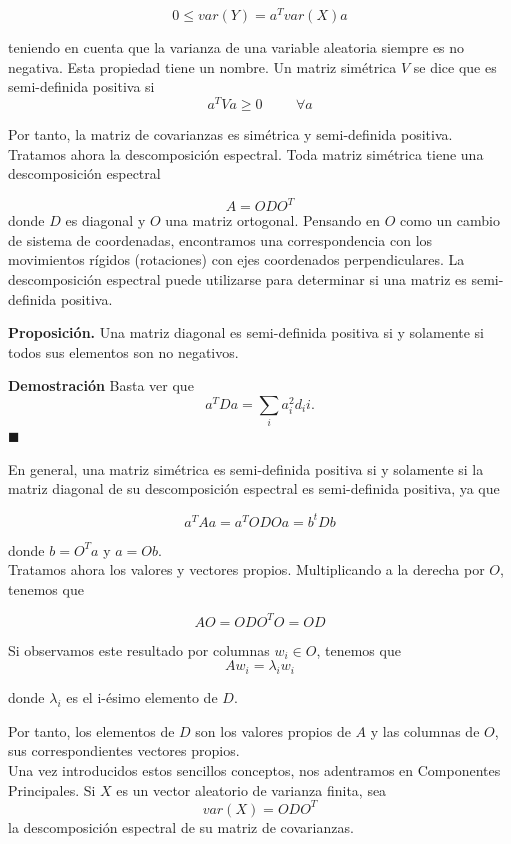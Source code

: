 	$$ 0 \leq var(Y) = a^T var(X) a$$
	
	teniendo en cuenta que la varianza de una variable aleatoria siempre es no negativa. Esta propiedad tiene un nombre. Un matriz simétrica $V$ se dice que es semi-definida positiva si 
	$$a^T V a \geq 0 \hspace{1cm} \forall a$$
	
	Por tanto, la matriz de covarianzas es simétrica y semi-definida positiva. \\
	
	Tratamos ahora la descomposición espectral. Toda matriz simétrica tiene una descomposición espectral
	
	$$A = ODO^T$$
	donde $D$ es diagonal y $O$ una matriz ortogonal. Pensando en $O$ como un cambio de sistema de coordenadas, encontramos una correspondencia con los movimientos rígidos (rotaciones) con ejes coordenados perpendiculares. La descomposición espectral puede utilizarse para determinar si una matriz es semi-definida positiva. 
	
	\textbf{Proposición.} Una matriz diagonal es semi-definida positiva si y solamente si todos sus elementos son no negativos.
	
	\textbf{Demostración} Basta ver que 
	$$a^T D a = \sum_{i} a_i^2 d_ii.$$
	\hfill$\blacksquare$
	
	En general, una matriz simétrica es semi-definida positiva si y solamente si la matriz diagonal de su descomposición espectral es semi-definida positiva, ya que
	
	$$a^T A a = a^T ODO a = b^t D b$$
	
	donde $b= O^Ta$ y $a = Ob$. \\
	
	Tratamos ahora los valores y vectores propios. Multiplicando a la derecha por $O$, tenemos que
	
	$$AO = ODO^TO = OD$$
	
	Si observamos este resultado por columnas $w_i \in O$, tenemos que
	$$ A w_i = \lambda_i w_i$$
	
	donde $\lambda_i$ es el i-ésimo elemento de $D$.
	
	Por tanto, los elementos de $D$ son los valores propios de $A$ y las columnas de $O$, sus correspondientes vectores propios. \\
	
	Una vez introducidos estos sencillos conceptos, nos adentramos en Componentes Principales. Si $X$ es un vector aleatorio de varianza finita, sea 
	$$var(X) = ODO^T$$
	la descomposición espectral de su matriz de covarianzas.
	
